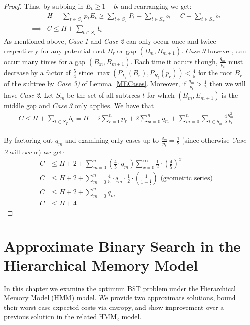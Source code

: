 \documentclass[letterpaper,12pt,titlepage,oneside,final]{book}
\theoremstyle{plain}
\begin{document}
\begin{proof}
\noindent Thus, by subbing in $E_t \geq 1 - b_t$ and rearranging we get: 
\begin{align*}
&H = \sum_{t \in S_T} p_t E_t \geq \sum_{t \in S_T} P_t - \sum_{t \in S_T} b_t = C - \sum_{t \in S_T} b_t \\
 \implies &C \leq H + \sum_{t \in S_T} b_t
\end{align*}
As mentioned above, \textit{Case 1} and \textit{Case 2} can only occur once and twice respectively for any potential root $B_r$ or gap $(B_m, B_{m+1})$. \textit{Case 3} however, can occur many times for a gap $(B_m, B_{m+1})$. Each time it occurs though, $\frac{q_m}{p_t}$ must decrease by a factor of $\frac{5}{4}$ since $\max(P_{L_t}(B_r), P_{R_t}(p_r)) < \frac{4}{5}$ for the root $B_r$ of the subtree by \textit{Case 3)} of Lemma~\ref{MECases}. Moreover, if $\frac{q_m}{p_t} > \frac{1}{2}$ then we will have \textit{Case 2}. Let $S_m$ be the set of all subtrees $t$ for which $(B_m, B_{m+1})$ is the middle gap and \textit{Case 3} only applies. We have that
\begin{align*}
C \leq H + \sum_{t \in S_T} b_t = H + 2 \sum\limits_{r = 1}^n p_r + 2 \sum\limits_{m = 0}^n q_m + \sum\limits_{m = 0}^n \sum\limits_{t \in S_m} \frac{4}{5}\frac{q_m^2}{p_t}
\end{align*}
 \\ 
By factoring out $q_m$ and examining only cases up to $\frac{q_m}{p_t} = \frac{1}{2}$ (since otherwise \textit{Case 2} will occur) we get:
\begin{align*}
C &\leq H + 2 + \sum\limits_{m = 0}^n (\frac{4}{5} \cdot q_m) \sum\limits_{x=0}^{\infty} \frac{1}{2} \cdot (\frac{4}{5}) ^ x \\
C &\leq H + 2 + \sum\limits_{m = 0}^n \frac{4}{5} \cdot q_m \cdot \frac{1}{2} \cdot (\frac{1}{1-\frac{4}{5}}) \text{    (geometric series)} \\
C &\leq H + 2 + \sum\limits_{m = 0}^n q_m \\
C &\leq H + 4
\end{align*}

\end{proof}

\chapter{Approximate Binary Search in the Hierarchical Memory Model}\label{Approximate Binary Search in the Hierarchical Memory Model}
 
In this chapter we examine the optimum BST problem under the Hierarchical Memory Model (HMM) model. We provide two approximate solutions, bound their worst case expected costs via entropy, and show improvement over a previous solution in the related HMM$_2$ model. 
 
\end{document}
